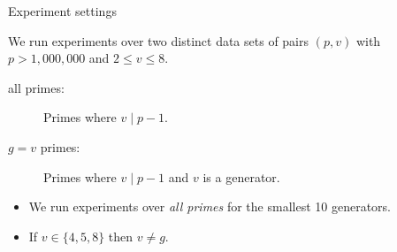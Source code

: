 
\begin{frame}{Experiment settings}

    We run experiments over two distinct data sets of pairs $(p, v)$ with $p > 1,000,000$ and $2 \leq v \leq 8$.
    
    \begin{description}
        \item[all primes:] Primes where $v \mid p -1$.
        \item[$g = v$ primes:] Primes where $v \mid p -1$ and $v$ is a generator.
    \end{description}

    \pause
    
    
    \begin{itemize}
        \item We run experiments over \emph{all primes} for the smallest 10 generators.
        \item If $v\in\{4,5,8\}$ then $v\neq g$.
    \end{itemize}
\end{frame}


